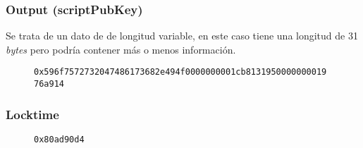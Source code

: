 \documentclass{article}
\begin{document}
    \subsubsection{Output (scriptPubKey)}
    Se trata de un dato de de longitud variable, en este caso tiene una longitud de 31 \textit{bytes} pero podría contener más o menos información. 
    \begin{figure}[H]
        \texttt{0x596f7572732047486173682e494f0000000001cb8131950000000019} \\
        \texttt{76a914}
    \end{figure}
    
    \subsubsection{Locktime}
    \begin{figure}[H]
        \texttt{0x80ad90d4}
    \end{figure}
    
\end{document}
